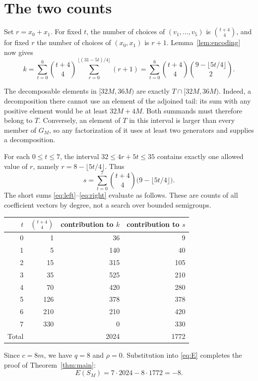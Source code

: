\documentclass[11pt]{article}
\begin{document}
\section{The two counts}
Set $r=x_0+x_1$. For fixed $t$, the number of choices of
$(v_1,\ldots,v_5)$ is $\binom{t+4}{4}$, and for fixed $r$ the number
of choices of $(x_0,x_1)$ is $r+1$.
Lemma~\ref{lem:encoding} now gives
\begin{equation}\label{eq:left}
 k=\sum_{t=0}^{6}\binom{t+4}{4}
       \sum_{r=0}^{\lfloor(31-5t)/4\rfloor}(r+1)
   =\sum_{t=0}^{6}\binom{t+4}{4}
       \binom{9-\lfloor5t/4\rfloor}{2}.
\end{equation}

The decomposable elements in $[32M,36M)$ are exactly
$T\cap[32M,36M)$. Indeed, a decomposition there cannot use an element
of the adjoined tail: its sum with any positive element would be at
least $32M+4M$. Both summands must therefore belong to $T$.
Conversely, an element of $T$ in this interval is larger than every
member of $G_M$, so any factorization of it uses at least two
generators and supplies a decomposition.

For each $0\le t\le7$, the interval
$32\le4r+5t\le35$ contains exactly one allowed value of $r$, namely
$r=8-\lfloor5t/4\rfloor$. Thus
\begin{equation}\label{eq:right}
 s=\sum_{t=0}^{7}\binom{t+4}{4}
                 \bigl(9-\lfloor5t/4\rfloor\bigr).
\end{equation}
The short sums \eqref{eq:left}--\eqref{eq:right} evaluate as follows.
These are counts of all coefficient vectors by degree, not a search
over bounded semigroups.
\begin{center}
\begin{tabular}{rrrr}
\toprule
$t$ & $\binom{t+4}{4}$ & contribution to $k$ & contribution to $s$\\
\midrule
0 & 1 & 36 & 9\\
1 & 5 & 140 & 40\\
2 & 15 & 315 & 105\\
3 & 35 & 525 & 210\\
4 & 70 & 420 & 280\\
5 & 126 & 378 & 378\\
6 & 210 & 210 & 420\\
7 & 330 & 0 & 330\\
\midrule
Total & & 2024 & 1772\\
\bottomrule
\end{tabular}
\end{center}
Since $c=8m$, we have $q=8$ and $\rho=0$. Substitution into
\eqref{eq:E} completes the proof of Theorem~\ref{thm:main}:
\[
 E(S_M)=7\cdot2024-8\cdot1772=-8.
\]
\end{document}
